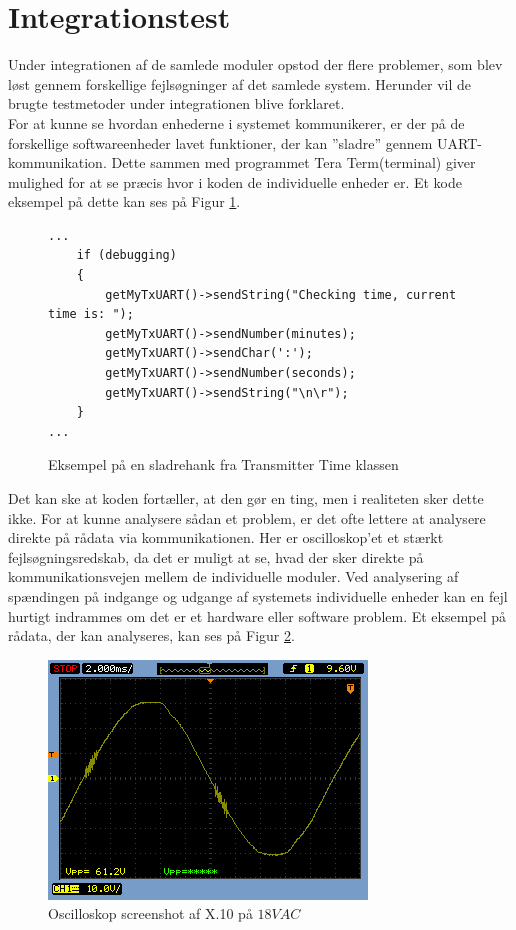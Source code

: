 \section{Integrationstest}
Under integrationen af de samlede moduler opstod der flere problemer, som blev løst gennem forskellige fejlsøgninger af det samlede system. Herunder vil de brugte testmetoder under integrationen blive forklaret.\\

For at kunne se hvordan enhederne i systemet kommunikerer, er der på de forskellige softwareenheder lavet funktioner, der kan ''sladre'' gennem UART-kommunikation. Dette sammen med programmet Tera Term(terminal) giver mulighed for at se præcis hvor i koden de individuelle enheder er. Et kode eksempel på dette kan ses på Figur \ref{fig:sladrehank}.\\

\begin{figure}[h]
	\begin{lstlisting}
...
	if (debugging)
	{
		getMyTxUART()->sendString("Checking time, current time is: ");
		getMyTxUART()->sendNumber(minutes);
		getMyTxUART()->sendChar(':');
		getMyTxUART()->sendNumber(seconds);
		getMyTxUART()->sendString("\n\r");
	}
...
	\end{lstlisting}
	\caption{Eksempel på en sladrehank fra Transmitter Time klassen}
	\label{fig:sladrehank}
\end{figure}

Det kan ske at koden fortæller, at den gør en ting, men i realiteten sker dette ikke. For at kunne analysere sådan et problem, er det ofte lettere at analysere direkte på rådata via kommunikationen. Her er oscilloskop'et et stærkt fejlsøgningsredskab, da det er muligt at se, hvad der sker direkte på kommunikationsvejen mellem de individuelle moduler. Ved analysering af spændingen på indgange og udgange af systemets individuelle enheder kan en fejl hurtigt indrammes om det er et hardware eller software problem. Et eksempel på rådata, der kan analyseres, kan ses på Figur \ref{fig:oscilloskop}.\\

\begin{figure}[h]
	\centering
	\includegraphics[scale=0.75, trim=0 0 0 0, clip=true]{Projektbeskrivelse/Integrationstest/billeder/Oscilloskop.png}
	\caption{Oscilloskop screenshot af X.10 på $18V AC$}
	\label{fig:oscilloskop}
\end{figure}


